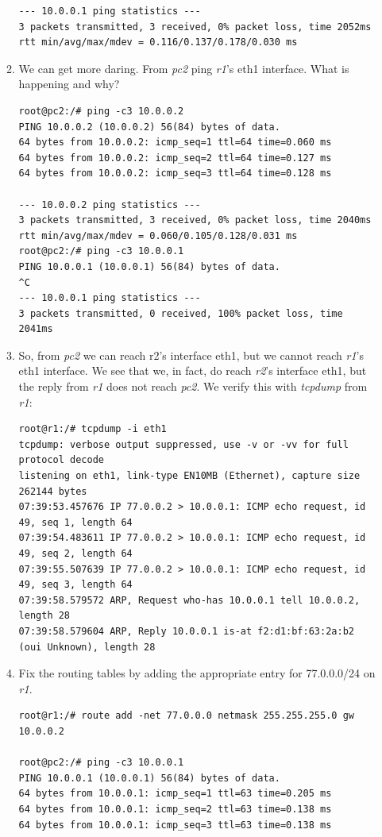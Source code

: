 \documentclass[12pt]{book}
\begin{document}
\begin{enumerate}[label=\arabic*.]
\begin{enumerate}[resume*]
\begin{lstlisting}
--- 10.0.0.1 ping statistics ---
3 packets transmitted, 3 received, 0% packet loss, time 2052ms
rtt min/avg/max/mdev = 0.116/0.137/0.178/0.030 ms
  \end{lstlisting}

\item We can get more daring. From \emph{pc2} ping \emph{r1}'s eth1 interface. What is happening and why?
  \begin{lstlisting}
root@pc2:/# ping -c3 10.0.0.2
PING 10.0.0.2 (10.0.0.2) 56(84) bytes of data.
64 bytes from 10.0.0.2: icmp_seq=1 ttl=64 time=0.060 ms
64 bytes from 10.0.0.2: icmp_seq=2 ttl=64 time=0.127 ms
64 bytes from 10.0.0.2: icmp_seq=3 ttl=64 time=0.128 ms

--- 10.0.0.2 ping statistics ---
3 packets transmitted, 3 received, 0% packet loss, time 2040ms
rtt min/avg/max/mdev = 0.060/0.105/0.128/0.031 ms
root@pc2:/# ping -c3 10.0.0.1
PING 10.0.0.1 (10.0.0.1) 56(84) bytes of data.
^C
--- 10.0.0.1 ping statistics ---
3 packets transmitted, 0 received, 100% packet loss, time 2041ms
  \end{lstlisting}

\item So, from \emph{pc2} we can reach r2's interface eth1, but we cannot reach \emph{r1}'s eth1 interface. We see that we, in fact, do reach \emph{r2}'s interface eth1, but the reply from \emph{r1} does not reach \emph{pc2}. We verify this with \emph{tcpdump} from \emph{r1}:

  \begin{lstlisting}
root@r1:/# tcpdump -i eth1
tcpdump: verbose output suppressed, use -v or -vv for full protocol decode
listening on eth1, link-type EN10MB (Ethernet), capture size 262144 bytes
07:39:53.457676 IP 77.0.0.2 > 10.0.0.1: ICMP echo request, id 49, seq 1, length 64
07:39:54.483611 IP 77.0.0.2 > 10.0.0.1: ICMP echo request, id 49, seq 2, length 64
07:39:55.507639 IP 77.0.0.2 > 10.0.0.1: ICMP echo request, id 49, seq 3, length 64
07:39:58.579572 ARP, Request who-has 10.0.0.1 tell 10.0.0.2, length 28
07:39:58.579604 ARP, Reply 10.0.0.1 is-at f2:d1:bf:63:2a:b2 (oui Unknown), length 28
  \end{lstlisting}

\item Fix the routing tables by adding the appropriate entry for 77.0.0.0/24 on \emph{r1}. 
  \begin{lstlisting}
root@r1:/# route add -net 77.0.0.0 netmask 255.255.255.0 gw 10.0.0.2

root@pc2:/# ping -c3 10.0.0.1
PING 10.0.0.1 (10.0.0.1) 56(84) bytes of data.
64 bytes from 10.0.0.1: icmp_seq=1 ttl=63 time=0.205 ms
64 bytes from 10.0.0.1: icmp_seq=2 ttl=63 time=0.138 ms
64 bytes from 10.0.0.1: icmp_seq=3 ttl=63 time=0.138 ms


\end{lstlisting}
\end{enumerate}
\end{enumerate}
\end{document}
